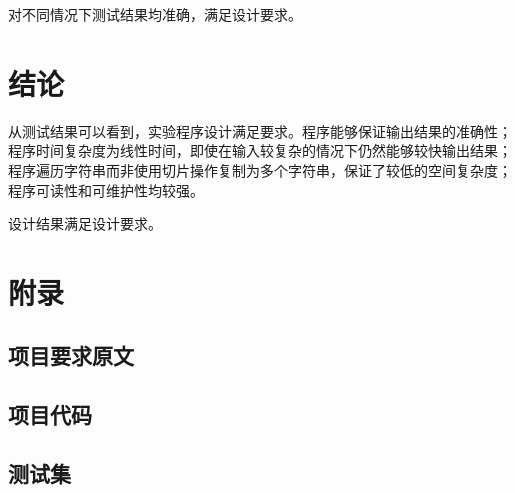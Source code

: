 \begin{spacing}{1.5}
    对不同情况下测试结果均准确，满足设计要求。

    \section{结论}
    从测试结果可以看到，实验程序设计满足要求。程序能够保证输出结果的准确性；程序时间复杂度为线性时间，即使在输入较复杂的情况下仍然能够较快输出结果；程序遍历字符串而非使用切片操作复制为多个字符串，保证了较低的空间复杂度；程序可读性和可维护性均较强。

    设计结果满足设计要求。

    \section{附录}
    \subsection{项目要求原文}
    

    \subsection{项目代码}
    

    \subsection{测试集}
    


\end{spacing}


